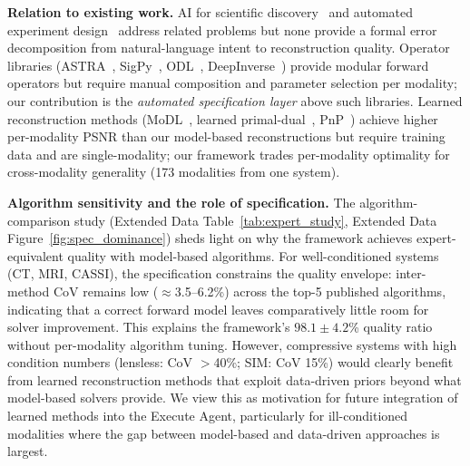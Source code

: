 \documentclass[11pt,a4paper]{article}
\begin{document}
\textbf{Relation to existing work.}
AI for scientific discovery~\cite{jumper2021alphafold,merchant2023gnome,wang2023scientific,boiko2023autonomous} and automated experiment design~\cite{tian2023ci,boiko2023autonomous} address related problems but none provide a formal error decomposition from natural-language intent to reconstruction quality.  Operator libraries (ASTRA~\cite{aarle2016}, SigPy~\cite{ong2019sigpy}, ODL~\cite{adler2017odl}, DeepInverse~\cite{tachella2023deepinverse}) provide modular forward operators but require manual composition and parameter selection per modality; our contribution is the \emph{automated specification layer} above such libraries.  Learned reconstruction methods (MoDL~\cite{aggarwal2019modl}, learned primal-dual~\cite{adler2018learned}, PnP~\cite{kamilov2023pnp}) achieve higher per-modality PSNR than our model-based reconstructions but require training data and are single-modality; our framework trades per-modality optimality for cross-modality generality (173 modalities from one system).

\textbf{Algorithm sensitivity and the role of specification.}
The algorithm-comparison study (Extended Data Table~\ref{tab:expert_study}, Extended Data Figure~\ref{fig:spec_dominance}) sheds light on why the framework achieves expert-equivalent quality with model-based algorithms.  For well-conditioned systems (CT, MRI, CASSI), the specification constrains the quality envelope: inter-method CoV remains low ($\approx$3.5--6.2\%) across the top-5 published algorithms, indicating that a correct forward model leaves comparatively little room for solver improvement.  This explains the framework's $98.1\pm4.2$\% quality ratio without per-modality algorithm tuning.  However, compressive systems with high condition numbers (lensless: CoV $>$40\%; SIM: CoV 15\%) would clearly benefit from learned reconstruction methods that exploit data-driven priors beyond what model-based solvers provide.  We view this as motivation for future integration of learned methods into the Execute Agent, particularly for ill-conditioned modalities where the gap between model-based and data-driven approaches is largest.
\end{document}
